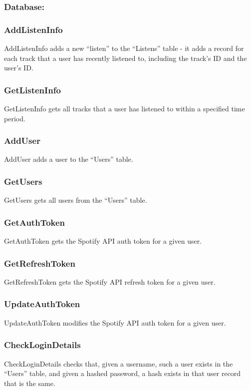 \documentclass[11pt]{report}
\begin{document}
\subsubsection{Database:}

\hrulefill

\subsubsection{AddListenInfo}
AddListenInfo adds a new “listen” to the “Listens” table - it adds a record for each track that a user has recently listened to, including the track’s ID and the user’s ID.

\subsubsection{GetListenInfo}
GetListenInfo gets all tracks that a user has listened to within a specified time period.

\subsubsection{AddUser}
AddUser adds a user to the “Users” table.

\subsubsection{GetUsers}
GetUsers gets all users from the “Users” table.

\subsubsection{GetAuthToken}
GetAuthToken gets the Spotify API auth token for a given user.

\subsubsection{GetRefreshToken}
GetRefreshToken gets the Spotify API refresh token for a given user.

\subsubsection{UpdateAuthToken}
UpdateAuthToken modifies the Spotify API auth token for a given user.

\subsubsection{CheckLoginDetails}
CheckLoginDetails checks that, given a username, such a user exists in the “Users” table, and given a hashed password, a hash exists in that user record that is the same.
\end{document}
